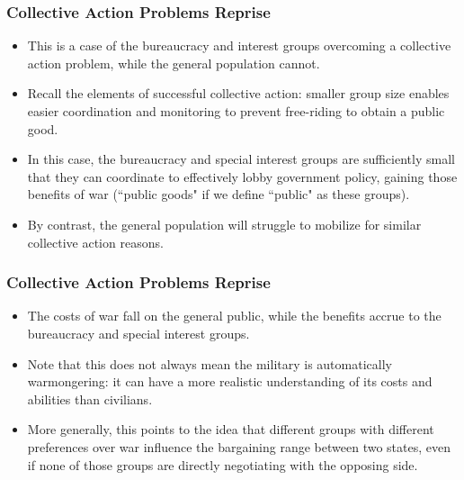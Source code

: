 \documentclass[handout]{beamer}
\begin{document}
\begin{frame} 
	\frametitle{\LARGE{Collective Action Problems Reprise}}
	\begin{itemize}
		\item This is a case of the bureaucracy and interest groups overcoming a collective action problem, while the general population cannot. \pause
		\item Recall the elements of successful collective action: smaller group size enables easier coordination and monitoring to prevent free-riding to obtain a public good. \pause
		\item In this case, the bureaucracy and special interest groups are sufficiently small that they can coordinate to effectively lobby government policy, gaining those benefits of war (``public goods" if we define ``public" as these groups).
		\item By contrast, the general population will struggle to mobilize for similar collective action reasons.
	\end{itemize}
\end{frame}

\begin{frame} 
	\frametitle{\LARGE{Collective Action Problems Reprise}}
	\begin{itemize}
		\item The costs of war fall on the general public, while the benefits accrue to the bureaucracy and special interest groups. \pause
		\item Note that this does not always mean the military is automatically warmongering: it can have a more realistic understanding of its costs and abilities than civilians. \pause
		\item More generally, this points to the idea that different groups with different preferences over war influence the bargaining range between two states, even if none of those groups are directly negotiating with the opposing side.
	\end{itemize}
\end{frame}

\end{document}
